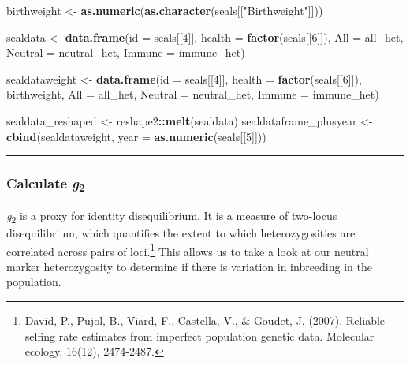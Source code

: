 \documentclass[]{article}
\newenvironment{Shaded}{\begin{snugshade}}{\end{snugshade}}
\newcommand{\KeywordTok}[1]{\textcolor[rgb]{0.13,0.29,0.53}{\textbf{#1}}}
\newcommand{\DataTypeTok}[1]{\textcolor[rgb]{0.13,0.29,0.53}{#1}}
\newcommand{\DecValTok}[1]{\textcolor[rgb]{0.00,0.00,0.81}{#1}}
\newcommand{\StringTok}[1]{\textcolor[rgb]{0.31,0.60,0.02}{#1}}
\newcommand{\OperatorTok}[1]{\textcolor[rgb]{0.81,0.36,0.00}{\textbf{#1}}}
\newcommand{\NormalTok}[1]{#1}
\let\rmarkdownfootnote\footnote%
\def\footnote{\protect\rmarkdownfootnote}
\begin{document}
\begin{Shaded}
\begin{Highlighting}[]
\NormalTok{birthweight <-}\StringTok{ }\KeywordTok{as.numeric}\NormalTok{(}\KeywordTok{as.character}\NormalTok{(seals[[}\StringTok{"Birthweight"}\NormalTok{]]))}

\NormalTok{sealdata <-}\StringTok{ }\KeywordTok{data.frame}\NormalTok{(}\DataTypeTok{id =}\NormalTok{ seals[[}\DecValTok{4}\NormalTok{]],  }\DataTypeTok{health =} \KeywordTok{factor}\NormalTok{(seals[[}\DecValTok{6}\NormalTok{]]), }
                       \DataTypeTok{All =}\NormalTok{ all_het, }\DataTypeTok{Neutral =}\NormalTok{ neutral_het, }\DataTypeTok{Immune =}\NormalTok{ immune_het)}

\NormalTok{sealdataweight <-}\StringTok{ }\KeywordTok{data.frame}\NormalTok{(}\DataTypeTok{id =}\NormalTok{ seals[[}\DecValTok{4}\NormalTok{]],  }\DataTypeTok{health =} \KeywordTok{factor}\NormalTok{(seals[[}\DecValTok{6}\NormalTok{]]), birthweight, }
                             \DataTypeTok{All =}\NormalTok{ all_het, }\DataTypeTok{Neutral =}\NormalTok{ neutral_het, }\DataTypeTok{Immune =}\NormalTok{ immune_het)}

\NormalTok{sealdata_reshaped <-}\StringTok{ }\NormalTok{reshape2}\OperatorTok{::}\KeywordTok{melt}\NormalTok{(sealdata)}
\NormalTok{sealdataframe_plusyear <-}\StringTok{ }\KeywordTok{cbind}\NormalTok{(sealdataweight, }\DataTypeTok{year =} \KeywordTok{as.numeric}\NormalTok{(seals[[}\DecValTok{5}\NormalTok{]])) }
\end{Highlighting}
\end{Shaded}

\begin{center}\rule{0.5\linewidth}{\linethickness}\end{center}

\subsubsection{\texorpdfstring{Calculate
\emph{g}\textsubscript{2}}{Calculate g2}}\label{calculate-g2}

\emph{g}\textsubscript{2} is a proxy for identity disequilibrium. It is
a measure of two-locus disequilibrium, which quantifies the extent to
which heterozygosities are correlated across pairs of loci.\footnote{David,
  P., Pujol, B., Viard, F., Castella, V., \& Goudet, J. (2007). Reliable
  selfing rate estimates from imperfect population genetic data.
  Molecular ecology, 16(12), 2474-2487.} This allows us to take a look
at our neutral marker heterozygosity to determine if there is variation
in inbreeding in the population.
\end{document}
